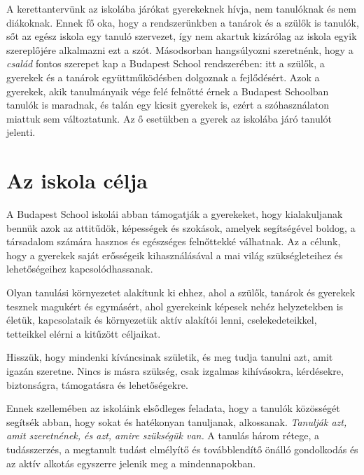 A kerettantervünk az iskolába járókat gyerekeknek hívja, nem tanulóknak és nem diákoknak. Ennek fő oka, hogy a rendszerünkben a tanárok és a szülők is tanulók, sőt az egész iskola egy tanuló szervezet, így nem akartuk  kizárólag az iskola egyik szereplőjére alkalmazni ezt a szót. Másodsorban hangsúlyozni szeretnénk, hogy a \emph{család} fontos szerepet kap a Budapest School rendszerében: itt a szülők, a gyerekek és a tanárok együttműködésben dolgoznak a fejlődésért. Azok a gyerekek, akik tanulmányaik vége felé felnőtté érnek a Budapest Schoolban tanulók is maradnak, és talán egy kicsit gyerekek is, ezért a szóhasználaton miattuk sem változtatunk. Az ő esetükben a gyerek az iskolába járó tanulót jelenti.

\section{Az iskola célja}

A Budapest School iskolái abban támogatják a gyerekeket, hogy kialakuljanak bennük azok az attitűdök, képességek és szokások, amelyek segítségével boldog, a társadalom számára hasznos és egészséges felnőttekké válhatnak. Az a célunk, hogy a gyerekek saját erősségeik kihasználásával a mai világ szükségleteihez és lehetőségeihez kapcsolódhassanak.

Olyan tanulási környezetet alakítunk ki ehhez, ahol a szülők, tanárok és gyerekek tesznek magukért és egymásért, ahol gyerekeink képesek nehéz helyzetekben is életük, kapcsolataik és környezetük aktív alakítói lenni, cselekedeteikkel, tetteikkel elérni a kitűzött céljaikat.

Hisszük, hogy mindenki kíváncsinak születik, és meg tudja tanulni azt, amit igazán szeretne. Nincs is másra szükség, csak izgalmas kihívásokra, kérdésekre, biztonságra, támogatásra és lehetőségekre.

Ennek szellemében az iskoláink elsődleges feladata, hogy a tanulók közösségét segítsék abban, hogy sokat és hatékonyan tanuljanak, alkossanak. \emph{Tanulják azt, amit szeretnének, és azt, amire szükségük van.} A tanulás három rétege, a tudásszerzés, a megtanult tudást elmélyítő és továbblendítő önálló gondolkodás és az aktív alkotás egyszerre jelenik meg a mindennapokban.

